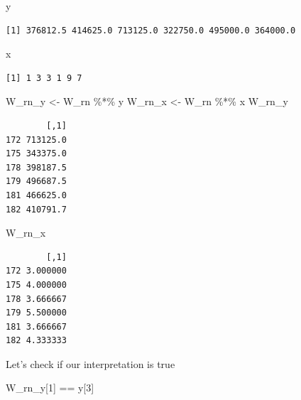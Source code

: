 \documentclass[
  letterpaper,
  DIV=11,
  numbers=noendperiod]{scrreprt}
\newenvironment{Shaded}{\begin{snugshade}}{\end{snugshade}}
\newcommand{\DecValTok}[1]{\textcolor[rgb]{0.68,0.00,0.00}{#1}}
\newcommand{\NormalTok}[1]{\textcolor[rgb]{0.00,0.23,0.31}{#1}}
\newcommand{\OtherTok}[1]{\textcolor[rgb]{0.00,0.23,0.31}{#1}}
\newcommand{\SpecialCharTok}[1]{\textcolor[rgb]{0.37,0.37,0.37}{#1}}
\begin{document}
\begin{Shaded}
\begin{Highlighting}[]
\NormalTok{y}
\end{Highlighting}
\end{Shaded}

\begin{verbatim}
[1] 376812.5 414625.0 713125.0 322750.0 495000.0 364000.0
\end{verbatim}

\begin{Shaded}
\begin{Highlighting}[]
\NormalTok{x}
\end{Highlighting}
\end{Shaded}

\begin{verbatim}
[1] 1 3 3 1 9 7
\end{verbatim}

\begin{Shaded}
\begin{Highlighting}[]
\NormalTok{W\_rn\_y }\OtherTok{\textless{}{-}}\NormalTok{ W\_rn }\SpecialCharTok{\%*\%}\NormalTok{ y}
\NormalTok{W\_rn\_x }\OtherTok{\textless{}{-}}\NormalTok{ W\_rn }\SpecialCharTok{\%*\%}\NormalTok{ x}
\NormalTok{W\_rn\_y}
\end{Highlighting}
\end{Shaded}

\begin{verbatim}
        [,1]
172 713125.0
175 343375.0
178 398187.5
179 496687.5
181 466625.0
182 410791.7
\end{verbatim}

\begin{Shaded}
\begin{Highlighting}[]
\NormalTok{W\_rn\_x}
\end{Highlighting}
\end{Shaded}

\begin{verbatim}
        [,1]
172 3.000000
175 4.000000
178 3.666667
179 5.500000
181 3.666667
182 4.333333
\end{verbatim}

Let's check if our interpretation is true

\begin{Shaded}
\begin{Highlighting}[]
\NormalTok{W\_rn\_y[}\DecValTok{1}\NormalTok{] }\SpecialCharTok{==}\NormalTok{ y[}\DecValTok{3}\NormalTok{]}
\end{Highlighting}
\end{Shaded}
\end{document}
